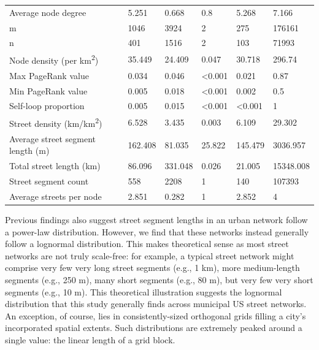\documentclass[Afour,sageh,times]{sagej}
\begin{document}
\begin{table}
\begin{tabular}{llllll}
	Average node degree                         & 5.251   & 0.668   & 0.8            & 5.268          & 7.166     \\
	m                                           & 1046    & 3924    & 2              & 275            & 176161    \\
	n                                           & 401     & 1516    & 2              & 103            & 71993     \\
	Node density (per km\textsuperscript{2})                      & 35.449  & 24.409  & 0.047          & 30.718         & 296.74    \\
	Max PageRank value                          & 0.034   & 0.046   & \textless0.001 & 0.021          & 0.87      \\
	Min PageRank value                          & 0.005   & 0.018   & \textless0.001 & 0.002          & 0.5       \\
	Self-loop proportion                        & 0.005   & 0.015   & \textless0.001 & \textless0.001 & 1         \\
	Street density (km/km\textsuperscript{2})                     & 6.528   & 3.435   & 0.003          & 6.109          & 29.302    \\
	Average street segment length (m)           & 162.408 & 81.035  & 25.822         & 145.479        & 3036.957  \\
	Total street length (km)                    & 86.096  & 331.048 & 0.026          & 21.005         & 15348.008 \\
	Street segment count                        & 558     & 2208    & 1              & 140            & 107393    \\
	Average streets per node                    & 2.851   & 0.282   & 1              & 2.852          & 4         \\
	\bottomrule
\end{tabular}
\end{table}

Previous findings \citep[e.g.,][]{masucci_random_2009} also suggest street segment lengths in an urban network follow a power-law distribution. However, we find that these networks instead generally follow a lognormal distribution. This makes theoretical sense as most street networks are not truly scale-free: for example, a typical street network might comprise very few very long street segments (e.g., 1 km), more medium-length segments (e.g., 250 m), many short segments (e.g., 80 m), but very few very short segments (e.g., 10 m). This theoretical illustration suggests the lognormal distribution that this study generally finds across municipal US street networks. An exception, of course, lies in consistently-sized orthogonal grids filling a city's incorporated spatial extents. Such distributions are extremely peaked around a single value: the linear length of a grid block.
\end{document}
